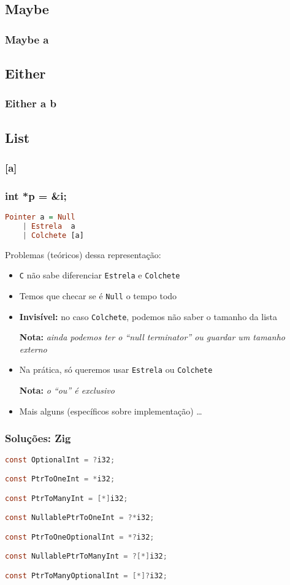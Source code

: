 \documentclass{beamer}
\newcommand{\nota}[1]{\textbf{Nota:}\textit{ #1}}
\begin{document}
\subsection{Maybe}
\begin{frame}
    \frametitle{Maybe a}
\end{frame}

\subsection{Either}
\begin{frame}
    \frametitle{Either a b}
\end{frame}

\subsection{List}
\begin{frame}
    \frametitle{[a]}
\end{frame}

\begin{frame}[fragile]
    \frametitle{int *p = \&i;}
    \begin{lstlisting}[language=Haskell]
Pointer a = Null
    | Estrela  a
    | Colchete [a]
    \end{lstlisting}
    \vfill
    Problemas (teóricos) dessa representação:
    \begin{itemize}
        \item
            \texttt{C} não sabe diferenciar
            \texttt{Estrela} e \texttt{Colchete}
        \item
            Temos que checar se é \texttt{Null} o tempo todo
        \item
            \textbf{Invisível:} no caso \texttt{Colchete},
            podemos não saber o tamanho da lista
            \par
            \nota{ainda podemos ter o ``null terminator''
            ou guardar um tamanho externo}
        \item
            Na prática, só queremos usar
            \texttt{Estrela} ou \texttt{Colchete}
            \par
            \nota{o ``ou'' é exclusivo}
        \item
            Mais alguns (específicos sobre implementação) \dots
    \end{itemize}
\end{frame}

\begin{frame}[fragile]
    \frametitle{Soluções: Zig}
    \begin{lstlisting}[language=C]
const OptionalInt = ?i32;

const PtrToOneInt = *i32;

const PtrToManyInt = [*]i32;

const NullablePtrToOneInt = ?*i32;

const PtrToOneOptionalInt = *?i32;

const NullablePtrToManyInt = ?[*]i32;

const PtrToManyOptionalInt = [*]?i32;
    \end{lstlisting}
\end{frame}
\end{document}
